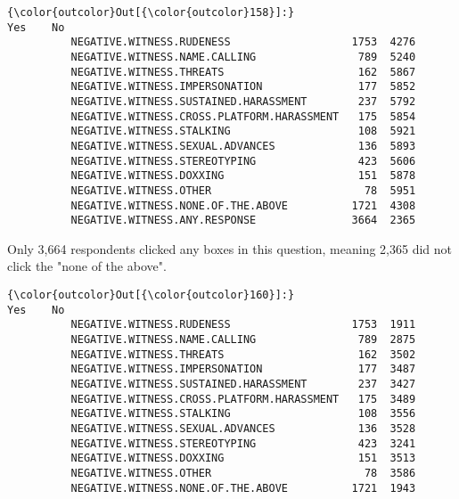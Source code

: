 \documentclass[11pt]{article}
\begin{document}
            \begin{Verbatim}[commandchars=\\\{\}]
{\color{outcolor}Out[{\color{outcolor}158}]:}                                              Yes    No
          NEGATIVE.WITNESS.RUDENESS                   1753  4276
          NEGATIVE.WITNESS.NAME.CALLING                789  5240
          NEGATIVE.WITNESS.THREATS                     162  5867
          NEGATIVE.WITNESS.IMPERSONATION               177  5852
          NEGATIVE.WITNESS.SUSTAINED.HARASSMENT        237  5792
          NEGATIVE.WITNESS.CROSS.PLATFORM.HARASSMENT   175  5854
          NEGATIVE.WITNESS.STALKING                    108  5921
          NEGATIVE.WITNESS.SEXUAL.ADVANCES             136  5893
          NEGATIVE.WITNESS.STEREOTYPING                423  5606
          NEGATIVE.WITNESS.DOXXING                     151  5878
          NEGATIVE.WITNESS.OTHER                        78  5951
          NEGATIVE.WITNESS.NONE.OF.THE.ABOVE          1721  4308
          NEGATIVE.WITNESS.ANY.RESPONSE               3664  2365
\end{Verbatim}
        
    Only 3,664 respondents clicked any boxes in this question, meaning 2,365
did not click the "none of the above".



            \begin{Verbatim}[commandchars=\\\{\}]
{\color{outcolor}Out[{\color{outcolor}160}]:}                                              Yes    No
          NEGATIVE.WITNESS.RUDENESS                   1753  1911
          NEGATIVE.WITNESS.NAME.CALLING                789  2875
          NEGATIVE.WITNESS.THREATS                     162  3502
          NEGATIVE.WITNESS.IMPERSONATION               177  3487
          NEGATIVE.WITNESS.SUSTAINED.HARASSMENT        237  3427
          NEGATIVE.WITNESS.CROSS.PLATFORM.HARASSMENT   175  3489
          NEGATIVE.WITNESS.STALKING                    108  3556
          NEGATIVE.WITNESS.SEXUAL.ADVANCES             136  3528
          NEGATIVE.WITNESS.STEREOTYPING                423  3241
          NEGATIVE.WITNESS.DOXXING                     151  3513
          NEGATIVE.WITNESS.OTHER                        78  3586
          NEGATIVE.WITNESS.NONE.OF.THE.ABOVE          1721  1943
\end{Verbatim}
        
\end{document}
